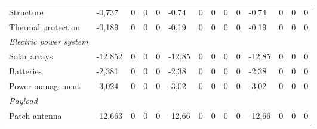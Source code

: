 \begin{landscape}
\begin{table}[]
{\begin{tabular}{| l | l | l | l | l | l | l | l | l | l | l | l | l | l |}
Structure                                                                              & -0,737           & 0           & 0           & 0           & -0,74           & 0           & 0           & 0           & 0           & -0,74           & 0            & 0            & 0            \\
Thermal protection                                                                     & -0,189           & 0           & 0           & 0           & -0,19           & 0           & 0           & 0           & 0           & -0,19           & 0            & 0            & 0            \\
\textit{Electric power system}                                                         &                  &                 &                 &                 &                 &                 &                 &                 &                 &                 &                  &                  &                  \\
Solar arrays                                                                           & -12,852          & 0           & 0           & 0           & -12,85          & 0           & 0           & 0           & 0           & -12,85          & 0            & 0            & 0            \\
Batteries                                                                              & -2,381           & 0           & 0           & 0           & -2,38           & 0           & 0           & 0           & 0           & -2,38           & 0            & 0            & 0            \\
Power management                                                                       & -3,024           & 0           & 0           & 0           & -3,02           & 0           & 0           & 0           & 0           & -3,02           & 0            & 0            & 0            \\
\textit{Payload}                                                                       &                  &                 &                 &                 &                 &                 &                 &                 &                 &                 &                  &                  &                  \\
Patch antenna                                                                          & -12,663          & 0           & 0           & 0           & -12,66          & 0           & 0           & 0           & 0           & -12,66          & 0            & 0            & 0            \\

\end{tabular}}
\end{table}
\end{landscape}
